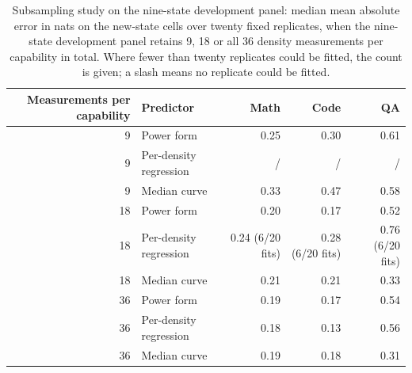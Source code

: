\begin{table}[tb]
\centering\footnotesize
\caption{Subsampling study on the nine-state development panel: median mean absolute error in nats
on the new-state cells over twenty fixed replicates, when the nine-state development panel retains
9, 18 or all 36 density measurements per capability in total. Where fewer than twenty replicates could be fitted, the count
is given; a slash means no replicate could be fitted.}
\label{tab:a9}
\begin{tabular*}{\textwidth}{@{\extracolsep{\fill}}rlrrr@{}}
\toprule
Measurements per capability & Predictor & Math & Code & QA \\
\midrule
9 & Power form & 0.25 & 0.30 & 0.61 \\
9 & Per-density regression & / & / & / \\
9 & Median curve & 0.33 & 0.47 & 0.58 \\
18 & Power form & 0.20 & 0.17 & 0.52 \\
18 & Per-density regression & 0.24 (6/20 fits) & 0.28 (6/20 fits) & 0.76 (6/20 fits) \\
18 & Median curve & 0.21 & 0.21 & 0.33 \\
36 & Power form & 0.19 & 0.17 & 0.54 \\
36 & Per-density regression & 0.18 & 0.13 & 0.56 \\
36 & Median curve & 0.19 & 0.18 & 0.31 \\
\bottomrule
\end{tabular*}
\end{table}

